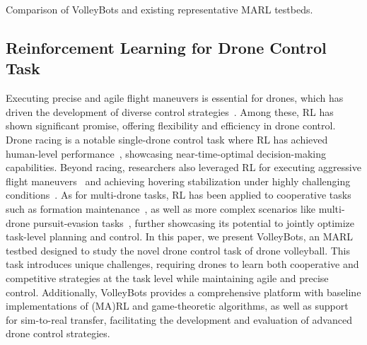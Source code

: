 \begin{table*}[t]
    \centering
    
    \caption{Comparison of VolleyBots and existing representative MARL testbeds.}
    \label{tab:comparison}
\end{table*}

\subsection{Reinforcement Learning for Drone Control Task}
Executing precise and agile flight maneuvers is essential for drones, which has driven the development of diverse control strategies~\cite{bouabdallah2004design,7989202,hwangbo2017control}. Among these, RL has shown significant promise, offering flexibility and efficiency in drone control. 
Drone racing is a notable single-drone control task where RL has achieved human-level performance~\cite{kaufmann2023champion}, showcasing near-time-optimal decision-making capabilities. Beyond racing, researchers also leveraged RL for executing aggressive flight maneuvers~\cite{sun2022aggressive} and achieving hovering stabilization under highly challenging conditions~\cite{hwangbo2017control}. As for multi-drone tasks, RL has been applied to cooperative tasks such as formation maintenance~\cite{swarm-formation}, as well as more complex scenarios like multi-drone pursuit-evasion tasks~\cite{chen2024multiuavpursuitevasiononlineplanning}, further showcasing its potential to jointly optimize task-level planning and control.
In this paper, we present VolleyBots, an MARL testbed designed to study the novel drone control task of drone volleyball. This task introduces unique challenges, requiring drones to learn both cooperative and competitive strategies at the task level while maintaining agile and precise control. Additionally, VolleyBots provides a comprehensive platform with baseline implementations of (MA)RL and game-theoretic algorithms, as well as support for sim-to-real transfer, facilitating the development and evaluation of advanced drone control strategies.


